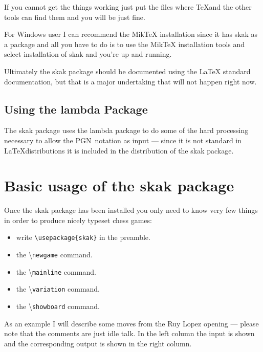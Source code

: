 \documentclass[10pt]{article}
\makeatletter
\renewcommand\showboard{\print@board}
\let\ORIshowboard\showboard
\renewcommand\showboard{%
    \makebox[8\squarelength]{%
    \rule{0pt}{9\squarelength}%
    \begin{postscript}%
    [trim = \squarelength{} 0pt \squarelength{} 0pt]
    \ORIshowboard
    \end{postscript}}}
\newcommand{\package}[1]{\textsf{#1}}
\newcommand{\command}[1]{\textbackslash\texttt{#1}}
\newcommand{\pgn}{PGN\ }
\makeatother
\begin{document}
If you cannot get the things working just put the files where \TeX and
the other tools can find them and you will be just fine.

For Windows user I can recommend the MikTeX installation since it has
skak as a package and all you have to do is to use the MikTeX
installation tools and select installation of skak and you're up and
running.

Ultimately the skak package should be documented using the \LaTeX
standard documentation, but that is a major undertaking that will not
happen right now.

\subsection{Using the \package{lambda} Package}
\label{sec:using-lambda}

The \package{skak} package uses the \package{lambda} package to do
some of the hard processing necessary to allow the \pgn notation as
input --- since it is not standard in \LaTeX distributions it is
included in the distribution of the \package{skak} package.


\section{Basic usage of the \package{skak} package}
\label{sec:basic-usage}

Once the \package{skak} package has been installed you only need to
know very few things in order to produce nicely typeset chess games:

\begin{itemize}
\item write \verb|\usepackage{skak}| in the preamble.
\item the \command{newgame} command.
\item the \command{mainline} command.
\item the \command{variation} command.
\item the \command{showboard} command.
\end{itemize}

As an example I will describe some moves from the Ruy Lopez opening
--- please note that the comments are just idle talk. In the left
column the input is shown and the corresponding output is shown in the
right column.

\begin{LTXexample}
\newgame
{}

\showboard
\end{LTXexample}
\end{document}
